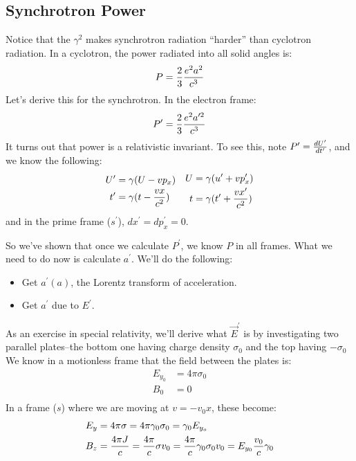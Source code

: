 \documentclass[11pt]{article}
\def\^{\hat}
\def\ef{\vec E}
\def\xp{{x^{\prime}}}
\begin{document}
\subsection*{ Synchrotron Power}

Notice that the $\gamma^2$ makes synchrotron radiation ``harder'' than
cyclotron radiation.  In a cyclotron, the power radiated into all solid
angles is:
$$P={2\over3}{e^2a^2\over c^3}$$
Let's derive this for the synchrotron.  In the electron frame:
$$P^\prime={2\over3}{e^2a^{\prime 2}\over c^3}$$
It turns out that power is a relativistic invariant.  To see this, note
$P^\prime={dU^\prime\over dt^\prime}$, and we know the following:
$$\begin{matrix}
\begin{aligned} U^\prime&=\gamma(U-vp_x)\\ 
t^\prime&=\gamma(t-{vx\over c^2})\\ \end{aligned}&
\begin{aligned} U&=\gamma(u^\prime+vp_x^\prime)\\ 
t&=\gamma(t^\prime+{v\xp\over c^2})\\ \end{aligned}
\end{matrix}$$
and in the prime frame  ($s^\prime$), $d\xp=dp_x^\prime=0$.\par
So we've shown that once we calculate $P^\prime$, we know $P$ in all frames.
What we need to do now is calculate $a^\prime$.  We'll do the following:
\begin{itemize}
\item  Get $a^\prime(a)$, the Lorentz transform of acceleration.
\item  Get $a^\prime$ due to $E^\prime$.
\end{itemize}
As an exercise in special relativity, we'll derive what $\ef^\prime$ is by
\def\sigo{\sigma_0}
investigating two parallel plates--the bottom one having charge density $\sigo$ 
and the top having $-\sigo$ We
know in a motionless frame that the field between the plates is:
$$\begin{aligned}E_{y_0}&=4\pi\sigma_0\\ 
B_0&=0\\ \end{aligned}$$
In a frame ($s$) where we are moving at $v=-v_0\^x$, these become:
$$\begin{aligned}E_y&=4\pi\sigma=4\pi\gamma_0\sigo=\gamma_0E_{y_o}\\ 
B_z&={4\pi J\over c}={4\pi\over c}\sigma v_0={4\pi\over c}\gamma_0\sigo v_0=
E_{y_0}{v_0\over c}\gamma_0\\ \end{aligned}$$
\end{document}

